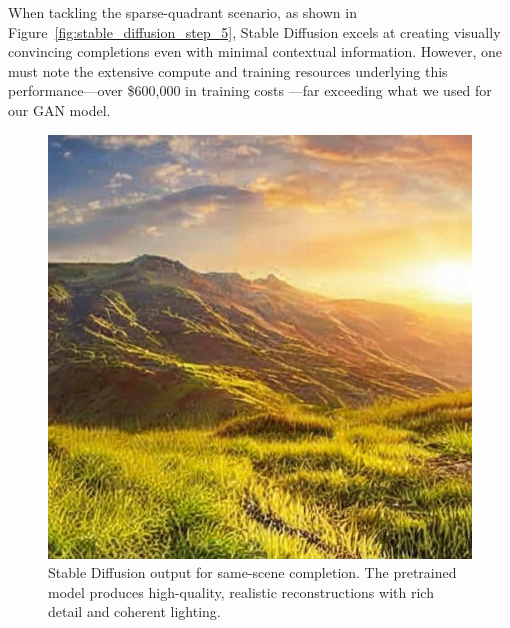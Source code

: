 \documentclass[sigconf]{acmart}
\begin{document}
When tackling the sparse-quadrant scenario, as shown in Figure~\ref{fig:stable_diffusion_step_5}, Stable Diffusion excels at creating visually convincing completions even with minimal contextual information. However, one must note the extensive compute and training resources underlying this performance—over \$600,000 in training costs \cite{Mostaque2022}—far exceeding what we used for our GAN model.

\begin{figure}[h!]
    \centering
    \includegraphics[width=\linewidth]{stable_diffusion_step_2_1}
    \caption{Stable Diffusion output for same-scene completion. The pretrained model produces high-quality, realistic reconstructions with rich detail and coherent lighting.}
    \label{fig:stable_diffusion_step_2_1}
\end{figure}
\end{document}
